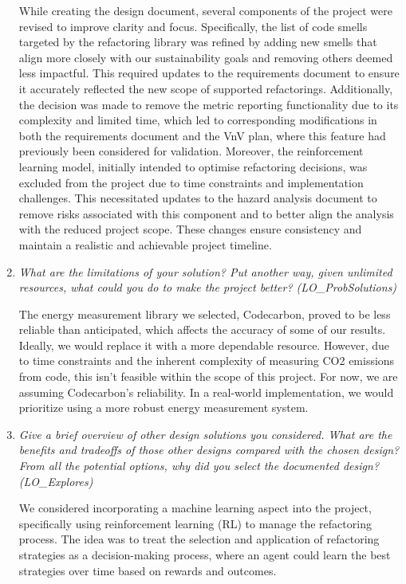 \documentclass[12pt, titlepage]{article}
\begin{document}
\begin{enumerate}
  While creating the design document, several components of the project were revised to improve clarity and focus. Specifically, the list of code smells targeted by the refactoring library was refined by adding new smells that align more closely with our sustainability goals and removing others deemed less impactful. This required updates to the requirements document to ensure it accurately reflected the new scope of supported refactorings. Additionally, the decision was made to remove the metric reporting functionality due to its complexity and limited time, which led to corresponding modifications in both the requirements document and the VnV plan, where this feature had previously been considered for validation. Moreover, the reinforcement learning model, initially intended to optimise refactoring decisions, was excluded from the project due to time constraints and implementation challenges. This necessitated updates to the hazard analysis document to remove risks associated with this component and to better align the analysis with the reduced project scope. These changes ensure consistency and maintain a realistic and achievable project timeline. 

  \item \textit {What are the limitations of your solution?  Put another way, given unlimited resources, what could you do to make the project better? (LO\_ProbSolutions)}

  The energy measurement library we selected, Codecarbon, proved to be less reliable 
  than anticipated, which affects the accuracy of some of our results. Ideally, 
  we would replace it with a more dependable resource. However, due to time 
  constraints and the inherent complexity of measuring CO2 emissions from code, 
  this isn’t feasible within the scope of this project. For now, we are assuming 
  Codecarbon’s reliability. In a real-world implementation, we would prioritize 
  using a more robust energy measurement system.

  \item \textit {Give a brief overview of other design solutions you considered.  What
  are the benefits and tradeoffs of those other designs compared with the chosen
  design?  From all the potential options, why did you select the documented design?
  (LO\_Explores)}

  We considered incorporating a machine learning aspect into the project, 
  specifically using reinforcement learning (RL) to manage the refactoring 
  process. The idea was to treat the selection and application of 
  refactoring strategies as a decision-making process, where an agent 
  could learn the best strategies over time based on rewards and outcomes.


\end{enumerate}
\end{document}
